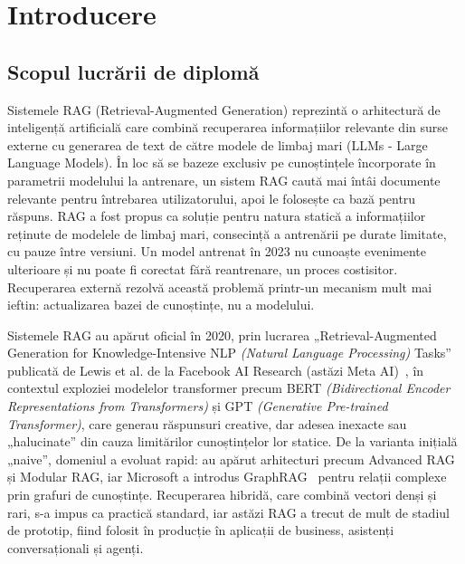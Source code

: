\chapter*{Introducere}

\section*{Scopul lucrării de diplomă} 

Sistemele RAG (Retrieval-Augmented Generation) reprezintă o arhitectură de inteligență artificială care combină recuperarea informațiilor relevante din surse externe cu generarea de text de către modele de limbaj mari (LLMs - Large Language Models). În loc să se bazeze exclusiv pe cunoștințele încorporate în parametrii modelului la antrenare, un sistem RAG caută mai întâi documente relevante pentru întrebarea utilizatorului, apoi le folosește ca bază pentru răspuns. RAG a fost propus ca soluție pentru natura statică a informațiilor reținute de modelele de limbaj mari, consecință a antrenării pe durate limitate, cu pauze între versiuni. Un model antrenat în 2023 nu cunoaște evenimente ulterioare și nu poate fi corectat fără reantrenare, un proces costisitor. Recuperarea externă rezolvă această problemă printr-un mecanism mult mai ieftin: actualizarea bazei de cunoștințe, nu a modelului.

Sistemele RAG au apărut oficial în 2020, prin lucrarea „Retrieval-Augmented Generation for Knowledge-Intensive NLP \textit{(Natural Language Processing)} Tasks” publicată de Lewis et al. de la Facebook AI Research (astăzi Meta AI)~\cite{lewis2020rag}, în contextul exploziei modelelor transformer precum BERT \textit{(Bidirectional Encoder Representations from Transformers)} și GPT \textit{(Generative Pre-trained Transformer)}, care generau răspunsuri creative, dar adesea inexacte sau „halucinate” din cauza limitărilor cunoștințelor lor statice. De la varianta inițială „naive”, domeniul a evoluat rapid: au apărut arhitecturi precum Advanced RAG și Modular RAG, iar Microsoft a introdus GraphRAG~\cite{edge2024graphrag} pentru relații complexe prin grafuri de cunoștințe. Recuperarea hibridă, care combină vectori denși și rari, s-a impus ca practică standard, iar astăzi RAG a trecut de mult de stadiul de prototip, fiind folosit în producție în aplicații de business, asistenți conversaționali și agenți.


